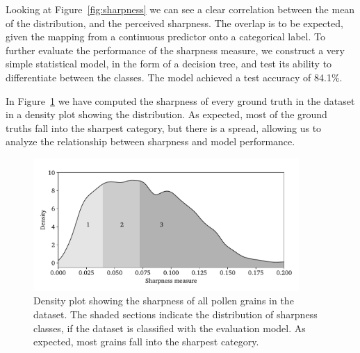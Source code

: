 Looking at Figure~\ref{fig:sharpness} we can see a clear correlation between the mean of the distribution, and the perceived sharpness.
The overlap is to be expected, given the mapping from a continuous predictor onto a categorical label.
To further evaluate the performance of the sharpness measure, we construct a very simple statistical model, in the form of a decision tree, and test its ability to differentiate between the classes.
The model achieved a test accuracy of 84.1\%. 

In Figure~\ref{fig:sharpness-all} we have computed the sharpness of every ground truth in the dataset in a density plot showing the distribution.
As expected, most of the ground truths fall into the sharpest category, but there is a spread, allowing us to analyze the relationship between sharpness and model performance.

\begin{figure}[htbp]
  \centering
  \includegraphics[width=0.9\textwidth]{figs/sharpness_all.pdf}
  \caption[Distribution of sharpness across entire dataset]{Density plot showing the sharpness of all pollen grains in the dataset. The shaded sections indicate the distribution of sharpness classes, if the dataset is classified with the evaluation model. As expected, most grains fall into the sharpest category.}\label{fig:sharpness-all}
\end{figure}